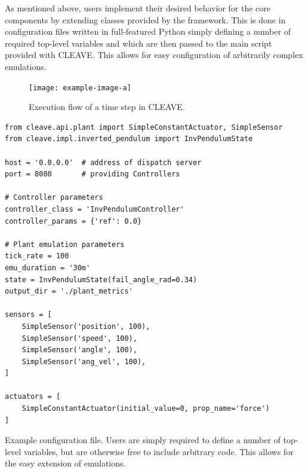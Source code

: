 \begin{description}[wide]
    \item[Plain Python configuration.]
    As mentioned above, users implement their desired behavior for the core components by extending classes provided by the framework.
    This is done in configuration files written in full-featured Python simply defining a number of required top-level variables and which are then passed to the main script provided with CLEAVE.
    This allows for easy configuration of arbitrarily complex emulations.
    
\end{description}

\begin{figure}
    \centering
    \texttt{[image: example-image-a]}
    \caption{Execution flow of a time step in CLEAVE.}
\end{figure}
    
\begin{listing}
    \begin{verbatim}
from cleave.api.plant import SimpleConstantActuator, SimpleSensor
from cleave.impl.inverted_pendulum import InvPendulumState

host = '0.0.0.0'  # address of dispatch server
port = 8080       # providing Controllers

# Controller parameters
controller_class = 'InvPendulumController'
controller_params = {'ref': 0.0}

# Plant emulation parameters 
tick_rate = 100
emu_duration = '30m'
state = InvPendulumState(fail_angle_rad=0.34)
output_dir = './plant_metrics'

sensors = [
    SimpleSensor('position', 100),
    SimpleSensor('speed', 100),
    SimpleSensor('angle', 100),
    SimpleSensor('ang_vel', 100),
]

actuators = [
    SimpleConstantActuator(initial_value=0, prop_name='force')
]
    \end{verbatim}
    \caption{
        Example configuration file.
        Users are simply required to define a number of top-level variables, but are otherwise free to include arbitrary code.
        This allows for the easy extension of emulations.
    }
    \label{lst:config}
\end{listing}
